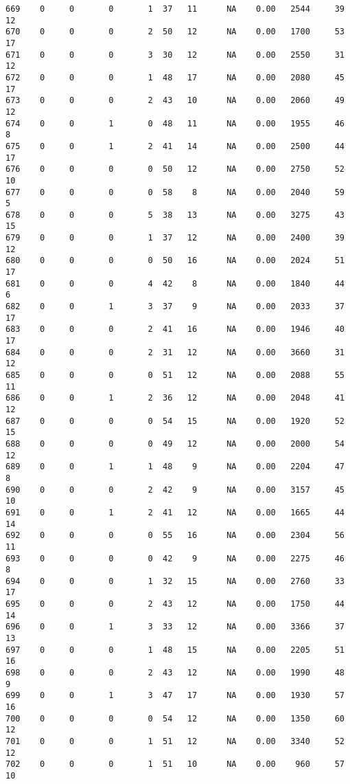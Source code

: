 \documentclass[
  letterpaper,
  DIV=11,
  numbers=noendperiod]{scrreprt}
\begin{document}
\begin{verbatim}
669    0     0       0       1  37   11      NA    0.00   2544     39      12
670    0     0       0       2  50   12      NA    0.00   1700     53      17
671    0     0       0       3  30   12      NA    0.00   2550     31      12
672    0     0       0       1  48   17      NA    0.00   2080     45      17
673    0     0       0       2  43   10      NA    0.00   2060     49      12
674    0     0       1       0  48   11      NA    0.00   1955     46       8
675    0     0       1       2  41   14      NA    0.00   2500     44      17
676    0     0       0       0  50   12      NA    0.00   2750     52      10
677    0     0       0       0  58    8      NA    0.00   2040     59       5
678    0     0       0       5  38   13      NA    0.00   3275     43      15
679    0     0       0       1  37   12      NA    0.00   2400     39      12
680    0     0       0       0  50   16      NA    0.00   2024     51      17
681    0     0       0       4  42    8      NA    0.00   1840     44       6
682    0     0       1       3  37    9      NA    0.00   2033     37      17
683    0     0       0       2  41   16      NA    0.00   1946     40      17
684    0     0       0       2  31   12      NA    0.00   3660     31      12
685    0     0       0       0  51   12      NA    0.00   2088     55      11
686    0     0       1       2  36   12      NA    0.00   2048     41      12
687    0     0       0       0  54   15      NA    0.00   1920     52      15
688    0     0       0       0  49   12      NA    0.00   2000     54      12
689    0     0       1       1  48    9      NA    0.00   2204     47       8
690    0     0       0       2  42    9      NA    0.00   3157     45      10
691    0     0       1       2  41   12      NA    0.00   1665     44      14
692    0     0       0       0  55   16      NA    0.00   2304     56      11
693    0     0       0       0  42    9      NA    0.00   2275     46       8
694    0     0       0       1  32   15      NA    0.00   2760     33      17
695    0     0       0       2  43   12      NA    0.00   1750     44      14
696    0     0       1       3  33   12      NA    0.00   3366     37      13
697    0     0       0       1  48   15      NA    0.00   2205     51      16
698    0     0       0       2  43   12      NA    0.00   1990     48       9
699    0     0       1       3  47   17      NA    0.00   1930     57      16
700    0     0       0       0  54   12      NA    0.00   1350     60      12
701    0     0       0       1  51   12      NA    0.00   3340     52      12
702    0     0       0       1  51   10      NA    0.00    960     57      10

\end{verbatim}
\end{document}
